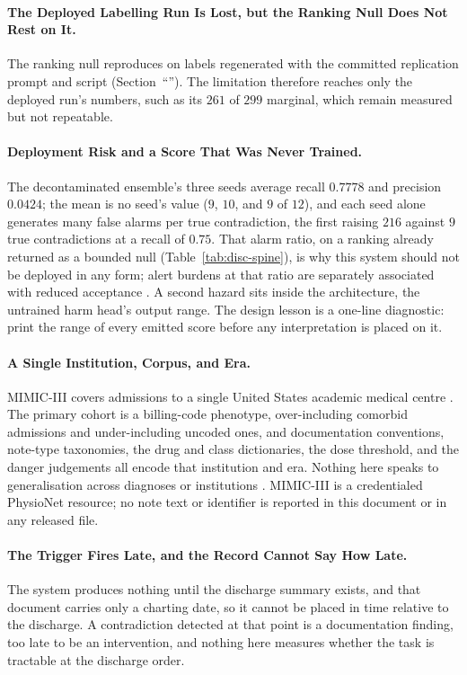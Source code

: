 \paragraph{The Deployed Labelling Run Is Lost, but the Ranking Null Does Not Rest on It.}  The ranking null reproduces on labels regenerated with the committed
replication prompt and script (Section~``''). The limitation therefore reaches only the deployed run's numbers, such as its $261$ of $299$ marginal, which remain measured but not repeatable.

\paragraph{Deployment Risk and a Score That Was Never Trained.} The decontaminated ensemble's three seeds average
recall $0.7778$ and precision $0.0424$; the mean is no seed's value ($9$, $10$, and $9$ of $12$), and each
seed alone generates many false alarms per true contradiction, the first raising
$216$ against $9$ true contradictions at a recall of $0.75$. That alarm
ratio, on a ranking already returned as a bounded null (Table~\ref{tab:disc-spine}), is why this
system should not be deployed in any form; alert burdens at that ratio are separately associated
with reduced acceptance \citep{vandersijs2006overriding,ancker2017alertfatigue}. A second hazard sits inside the architecture, the untrained harm head's output range.
The design lesson is a one-line diagnostic: print the range of every emitted score before any
interpretation is placed on it.

\paragraph{A Single Institution, Corpus, and Era.} MIMIC-III covers admissions
to a single United States academic medical centre \citep{johnson2016mimic}.
The primary cohort is a billing-code phenotype, over-including comorbid
admissions and under-including uncoded ones, and documentation conventions,
note-type taxonomies, the drug and class dictionaries, the dose threshold, and
the danger judgements all encode that institution and era.  Nothing here speaks to generalisation across diagnoses or
institutions \citep{zech2018generalization}. MIMIC-III is a credentialed
PhysioNet resource; no note text or identifier is reported in this document or
in any released file.

\paragraph{The Trigger Fires Late, and the Record Cannot Say How Late.} The system produces nothing until the discharge summary exists, and that document carries
only a charting date, so it cannot be placed in time relative to the discharge. A contradiction detected at that point is a documentation
finding, too late to be an intervention, and nothing here measures whether the task is tractable at the
discharge order.

